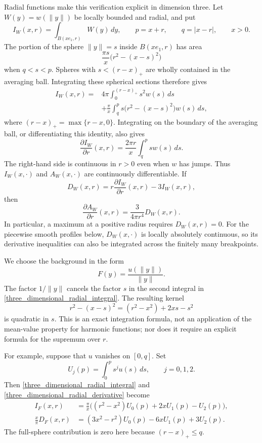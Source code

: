 \documentclass[12pt]{amsart}
\numberwithin{equation}{section}
\begin{document}
Radial functions make this verification explicit in dimension three.
Let $W(y)=w(\|y\|)$ be locally bounded and radial, and put
\[
I_W(x,r)=\int_{B(xe_1,r)}W(y)\,dy,
\qquad p=x+r,\qquad q=|x-r|,\qquad x>0.
\]
The portion of the sphere $\|y\|=s$ inside $B(xe_1,r)$ has area
\[
\frac{\pi s}{x}\bigl(r^2-(x-s)^2\bigr)
\]
when $q<s<p$. Spheres with $s<(r-x)_+$ are wholly contained in
the averaging ball. Integrating these spherical sections therefore gives
\begin{equation}
\label{three_dimensional_radial_integral}
\begin{aligned}
I_W(x,r)
={}&4\pi\int_0^{(r-x)_+}s^2w(s)\,ds\\
&+\frac{\pi}{x}\int_q^p
        s\bigl(r^2-(x-s)^2\bigr)w(s)\,ds,
\end{aligned}
\end{equation}
where $(r-x)_+=\max\{r-x,0\}$. Integrating on the boundary of the
averaging ball, or differentiating this identity, also gives
\begin{equation}
\label{three_dimensional_radial_derivative}
\frac{\partial I_W}{\partial r}(x,r)
     =\frac{2\pi r}{x}\int_q^p s w(s)\,ds.
\end{equation}
The right-hand side is continuous in $r>0$ even when $w$ has jumps.
Thus $I_W(x,\cdot)$ and $A_W(x,\cdot)$ are continuously differentiable.
If
\[
D_W(x,r)=r\frac{\partial I_W}{\partial r}(x,r)-3I_W(x,r),
\]
then
\begin{equation}
\label{three_dimensional_average_derivative}
\frac{\partial A_W}{\partial r}(x,r)
       =\frac{3}{4\pi r^4}D_W(x,r).
\end{equation}
In particular, a maximum at a positive radius requires $D_W(x,r)=0$.
For the piecewise smooth profiles below, $D_W(x,\cdot)$ is locally
absolutely continuous, so its derivative inequalities can also be
integrated across the finitely many breakpoints.

We choose the background in the form
\[
F(y)=\frac{u(\|y\|)}{\|y\|}.
\]
The factor $1/\|y\|$ cancels the factor $s$ in the second integral
in \eqref{three_dimensional_radial_integral}. The resulting kernel
\[
r^2-(x-s)^2=(r^2-x^2)+2xs-s^2
\]
is quadratic in $s$. This is an exact integration formula, not an
application of the mean-value property for harmonic functions; nor
does it require an explicit formula for the supremum over $r$.

For example, suppose that $u$ vanishes on $[0,q]$. Set
\[
U_j(p)=\int_0^p s^j u(s)\,ds,\qquad j=0,1,2.
\]
Then \eqref{three_dimensional_radial_integral} and
\eqref{three_dimensional_radial_derivative} become
\begin{align}
I_F(x,r)
 &=\frac{\pi}{x}\bigl((r^2-x^2)U_0(p)
                    +2xU_1(p)-U_2(p)\bigr),
       \label{three_dimensional_moment_integral}\\
\frac{x}{\pi}D_F(x,r)
 &=(3x^2-r^2)U_0(p)-6xU_1(p)+3U_2(p).
       \label{three_dimensional_moment_derivative}
\end{align}
The full-sphere contribution is zero here because $(r-x)_+\leq q$.
\end{document}
